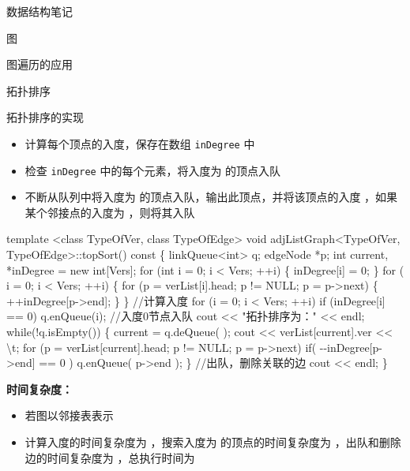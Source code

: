 \documentclass[
  ignorenonframetext,
]{beamer}
\newenvironment{Shaded}{}{}
\newcommand{\NormalTok}[1]{#1}
\providecommand{\tightlist}{%
  \setlength{\itemsep}{0pt}\setlength{\parskip}{0pt}}
\begin{document}
\begin{frame}[fragile]{数据结构笔记}
\begin{block}{图}
\begin{block}{图遍历的应用}
\begin{block}{拓扑排序}
\begin{block}{拓扑排序的实现}
\protect{}\label{ux62d3ux6251ux6392ux5e8fux7684ux5b9eux73b0}
\begin{itemize}
\tightlist
\item
  计算每个顶点的入度，保存在数组 \texttt{inDegree} 中
\item
  检查 \texttt{inDegree} 中的每个元素，将入度为 {} 的顶点入队
\item
  不断从队列中将入度为 {} 的顶点入队，输出此顶点，并将该顶点的入度
  {}，如果某个邻接点的入度为 {}，则将其入队
\end{itemize}

\begin{Shaded}
\begin{Highlighting}[]
\NormalTok{template \textless{}class TypeOfVer, class TypeOfEdge\textgreater{}}
\NormalTok{void adjListGraph\textless{}TypeOfVer, TypeOfEdge\textgreater{}::topSort() const}
\NormalTok{\{}
\NormalTok{  linkQueue\textless{}int\textgreater{} q;}
\NormalTok{  edgeNode *p;}
\NormalTok{  int current, *inDegree = new int[Vers];}
\NormalTok{  for (int i = 0; i \textless{} Vers; ++i)}
\NormalTok{  \{}
\NormalTok{    inDegree[i] = 0;}
\NormalTok{  \}}
\NormalTok{  for ( i = 0; i \textless{} Vers; ++i)}
\NormalTok{  \{}
\NormalTok{    for (p = verList[i].head; p != NULL; p = p{-}\textgreater{}next)}
\NormalTok{    \{}
\NormalTok{    ++inDegree[p{-}\textgreater{}end];}
\NormalTok{    \}}
\NormalTok{  \}                                                                 //计算入度}
\NormalTok{  for (i = 0; i \textless{} Vers; ++i)   if (inDegree[i] == 0) q.enQueue(i);  //入度0节点入队}
\NormalTok{  cout \textless{}\textless{} "拓扑排序为：" \textless{}\textless{} endl;}
\NormalTok{  while(!q.isEmpty())}
\NormalTok{  \{}
\NormalTok{    current = q.deQueue( );}
\NormalTok{    cout \textless{}\textless{} verList[current].ver \textless{}\textless{} \textquotesingle{}\textbackslash{}t\textquotesingle{};}
\NormalTok{    for (p = verList[current].head; p != NULL; p = p{-}\textgreater{}next)}
\NormalTok{    if( {-}{-}inDegree[p{-}\textgreater{}end] == 0 )    q.enQueue( p{-}\textgreater{}end );}
\NormalTok{  \}                                                                 //出队，删除关联的边}
\NormalTok{  cout \textless{}\textless{} endl;}
\NormalTok{\} }
\end{Highlighting}
\end{Shaded}

\textbf{时间复杂度：}

\begin{itemize}
\tightlist
\item
  若图以邻接表表示
\item
  计算入度的时间复杂度为 {}，搜索入度为 {} 的顶点的时间复杂度为
  {}，出队和删除边的时间复杂度为 {}，总执行时间为 {}
\end{itemize}
\end{block}
\end{block}


\end{block}
\end{block}
\end{frame}
\end{document}

